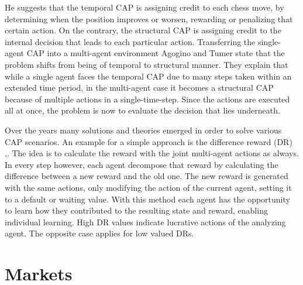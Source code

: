 He suggests that the temporal CAP is assigning credit to each chess move, by determining  when the position improves or worsen, rewarding or penalizing that certain action. On the contrary, the structural CAP is assigning credit to the internal decision that leads to each particular action. Transferring the single-agent CAP into a multi-agent environment Agogino and Tumer \cite{agtu04} state that the problem shifts from being of temporal to structural manner. They explain that while a single agent faces the temporal CAP due to many steps taken within an extended time period, in the multi-agent case it becomes a structural CAP because of multiple actions in a single-time-step. Since the actions are executed all at once, the problem is now to evaluate the decision that lies underneath.

Over the years many solutions and theories emerged in order to solve various CAP scenarios. An example for a simple approach is the difference reward (DR) \cite{agtu04},\cite{ngku18}. The idea is to calculate the reward with the joint multi-agent actions as always. In every step however, each agent decompose that reward by calculating the difference between a new reward and the old one. The new reward is generated with the same actions, only modifying the action of the current agent, setting it to a default or waiting value. With this method each agent has the opportunity to learn how they contributed to the resulting state and reward, enabling individual learning. High DR values indicate lucrative actions of the analyzing agent. The opposite case applies for low valued DRs.

\section{Markets}\label{market}
